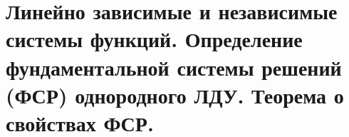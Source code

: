 {
	\section{Линейно зависимые и независимые системы функций. Определение фундаментальной системы решений (ФСР)
	однородного ЛДУ. Теорема о свойствах ФСР.}

	\newpage
}